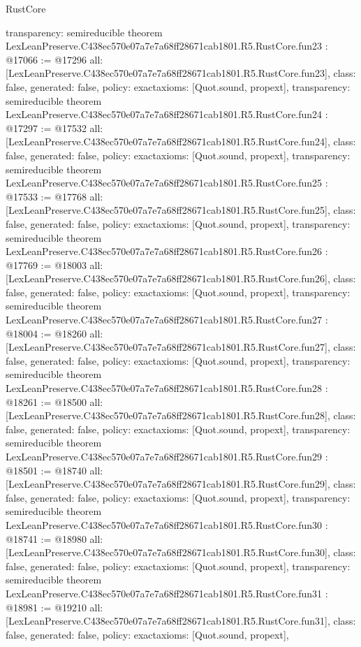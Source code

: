 \begin{lexlean}{RustCore}
\begin{coremodule}
{  transparency: semireducible
}
theorem LexLeanPreserve.C438ec570e07a7e7a68ff28671cab1801.R5.RustCore.fun23 : @17066 := @17296 {
  all: [LexLeanPreserve.C438ec570e07a7e7a68ff28671cab1801.R5.RustCore.fun23],
  class: false,
  generated: false,
  policy: exact{axioms: [Quot.sound, propext]},
  transparency: semireducible
}
theorem LexLeanPreserve.C438ec570e07a7e7a68ff28671cab1801.R5.RustCore.fun24 : @17297 := @17532 {
  all: [LexLeanPreserve.C438ec570e07a7e7a68ff28671cab1801.R5.RustCore.fun24],
  class: false,
  generated: false,
  policy: exact{axioms: [Quot.sound, propext]},
  transparency: semireducible
}
theorem LexLeanPreserve.C438ec570e07a7e7a68ff28671cab1801.R5.RustCore.fun25 : @17533 := @17768 {
  all: [LexLeanPreserve.C438ec570e07a7e7a68ff28671cab1801.R5.RustCore.fun25],
  class: false,
  generated: false,
  policy: exact{axioms: [Quot.sound, propext]},
  transparency: semireducible
}
theorem LexLeanPreserve.C438ec570e07a7e7a68ff28671cab1801.R5.RustCore.fun26 : @17769 := @18003 {
  all: [LexLeanPreserve.C438ec570e07a7e7a68ff28671cab1801.R5.RustCore.fun26],
  class: false,
  generated: false,
  policy: exact{axioms: [Quot.sound, propext]},
  transparency: semireducible
}
theorem LexLeanPreserve.C438ec570e07a7e7a68ff28671cab1801.R5.RustCore.fun27 : @18004 := @18260 {
  all: [LexLeanPreserve.C438ec570e07a7e7a68ff28671cab1801.R5.RustCore.fun27],
  class: false,
  generated: false,
  policy: exact{axioms: [Quot.sound, propext]},
  transparency: semireducible
}
theorem LexLeanPreserve.C438ec570e07a7e7a68ff28671cab1801.R5.RustCore.fun28 : @18261 := @18500 {
  all: [LexLeanPreserve.C438ec570e07a7e7a68ff28671cab1801.R5.RustCore.fun28],
  class: false,
  generated: false,
  policy: exact{axioms: [Quot.sound, propext]},
  transparency: semireducible
}
theorem LexLeanPreserve.C438ec570e07a7e7a68ff28671cab1801.R5.RustCore.fun29 : @18501 := @18740 {
  all: [LexLeanPreserve.C438ec570e07a7e7a68ff28671cab1801.R5.RustCore.fun29],
  class: false,
  generated: false,
  policy: exact{axioms: [Quot.sound, propext]},
  transparency: semireducible
}
theorem LexLeanPreserve.C438ec570e07a7e7a68ff28671cab1801.R5.RustCore.fun30 : @18741 := @18980 {
  all: [LexLeanPreserve.C438ec570e07a7e7a68ff28671cab1801.R5.RustCore.fun30],
  class: false,
  generated: false,
  policy: exact{axioms: [Quot.sound, propext]},
  transparency: semireducible
}
theorem LexLeanPreserve.C438ec570e07a7e7a68ff28671cab1801.R5.RustCore.fun31 : @18981 := @19210 {
  all: [LexLeanPreserve.C438ec570e07a7e7a68ff28671cab1801.R5.RustCore.fun31],
  class: false,
  generated: false,
  policy: exact{axioms: [Quot.sound, propext]},
}
\end{coremodule}
\end{lexlean}

